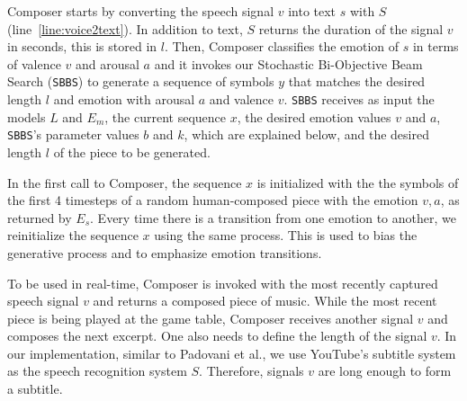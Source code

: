 Composer starts by converting the speech signal $v$ into text $s$ with $S$ (line~\ref{line:voice2text}). In addition to text, $S$ returns the duration of the signal $v$ in seconds, this is stored in $l$. Then, Composer classifies the emotion of $s$ in terms of valence $v$ and arousal $a$ and it
invokes our Stochastic Bi-Objective Beam Search (\texttt{SBBS}) to generate a sequence of symbols $y$ that matches the desired length $l$ and emotion with arousal $a$ and valence $v$.
\texttt{SBBS} receives as input the models $L$ and $E_m$, the current sequence $x$, the desired emotion values $v$ and $a$, \texttt{SBBS}'s parameter values $b$ and $k$, which are explained below, and the desired length $l$ of the piece to be generated. %

In the first call to Composer, the sequence $x$
is initialized with the the symbols of the first 4 timesteps of a random human-composed piece with the emotion $v, a$, as returned by $E_s$.
Every time
there is a transition from one emotion to another, we reinitialize the sequence $x$ using the same process. This is used to bias the generative process and to emphasize emotion transitions.

To be used in real-time, Composer is invoked with the most recently captured speech signal $v$ and returns a composed piece of music. While the most recent piece is being played at the game table, Composer receives another signal $v$ and composes the next excerpt. One also needs to define the length of the signal $v$. In our implementation, similar to Padovani et al.\cite{padovani2017}, we use YouTube's subtitle system as the speech recognition system $S$. Therefore, signals $v$ are long enough to form a
subtitle.

